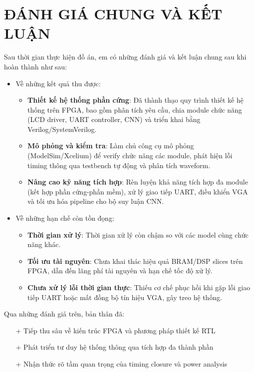 \documentclass[a4paper]{article}
\numberwithin{figure}{section}
\begin{document}
\section{ĐÁNH GIÁ CHUNG VÀ KẾT LUẬN}
Sau thời gian thực hiện đồ án, em có những đánh giá và kết luận chung sau khi hoàn thành như sau:
\begin{itemize}
    \item Về những kết quả thu được:
    \begin{itemize}
        \item \textbf{Thiết kế hệ thống phần cứng}: Đã thành thạo quy trình thiết kế hệ thống trên FPGA, bao gồm phân tích yêu cầu, chia module chức năng (LCD driver, UART controller, CNN) và triển khai bằng Verilog/SystemVerilog.
        \item \textbf{Mô phỏng và kiểm tra}: Làm chủ công cụ mô phỏng (ModelSim/Xcelium) để verify chức năng các module, phát hiện lỗi timing thông qua testbench tự động và phân tích waveform.
        \item \textbf{Nâng cao kỹ năng tích hợp}: Rèn luyện khả năng tích hợp đa module (kết hợp phần cứng-phần mềm), xử lý giao tiếp UART, điều khiển VGA và tối ưu hóa pipeline cho bộ suy luận CNN.
    \end{itemize}
    
    \item Về những hạn chế còn tồn đọng:
    \begin{itemize}

        \item \textbf{Thời gian xử lý}: Thời gian xử lý còn chậm so với các model cùng chức năng khác.
        \item \textbf{Tối ưu tài nguyên}: Chưa khai thác hiệu quả BRAM/DSP slices trên FPGA, dẫn đến lãng phí tài nguyên và hạn chế tốc độ xử lý.
        \item \textbf{Chưa xử lý lỗi thời gian thực}: Thiếu cơ chế phục hồi khi gặp lỗi giao tiếp UART hoặc mất đồng bộ tín hiệu VGA, gây treo hệ thống.
    \end{itemize}
\end{itemize}

Qua những đánh giá trên, bản thân đã:
\begin{itemize}
    \item[+] Tiếp thu sâu về kiến trúc FPGA và phương pháp thiết kế RTL
    \item[+] Phát triển tư duy hệ thống thông qua tích hợp đa thành phần
    \item[+] Nhận thức rõ tầm quan trọng của timing closure và power analysis
\end{itemize}
\end{document}

